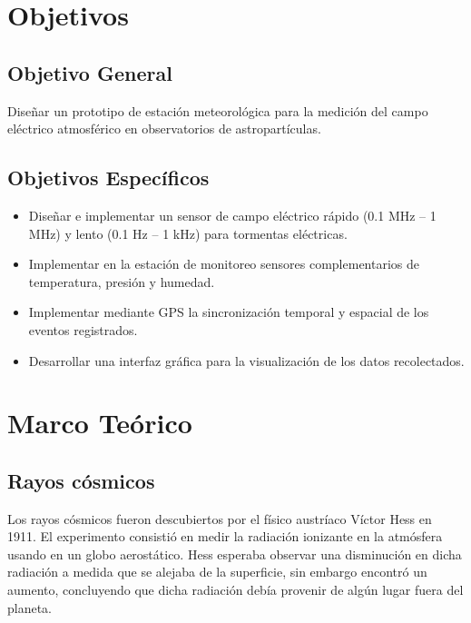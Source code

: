 \documentclass[12pt,a4paper,oneside]{book}
\begin{document}
\chapter{Objetivos}
\section{\textbf{Objetivo General}}

Diseñar un prototipo de estación meteorológica para la medición del campo eléctrico atmosférico en observatorios de astropartículas.


\section{\textbf{Objetivos Específicos}}

\begin{itemize}
    \item Diseñar e implementar un sensor de campo eléctrico rápido (0.1 MHz $–$ 1 MHz) y lento (0.1 Hz $–$ 1 kHz) para tormentas eléctricas.
    \item Implementar en la estación de monitoreo sensores complementarios de temperatura, presión y humedad.
    \item Implementar mediante GPS la sincronización temporal y espacial de los eventos registrados.
    \item Desarrollar una interfaz gráfica para la visualización de los datos recolectados.
\end{itemize}

\newpage
\chapter{Marco Teórico}

\section{Rayos cósmicos}

Los rayos cósmicos fueron descubiertos por el físico austríaco Víctor Hess en 1911. El experimento consistió en medir la radiación ionizante en la atmósfera usando en un globo aerostático. Hess esperaba observar una disminución en dicha radiación a medida que se alejaba de la superficie, sin embargo encontró un aumento, concluyendo que dicha radiación debía provenir de algún lugar fuera del planeta.\medskip
\end{document}
